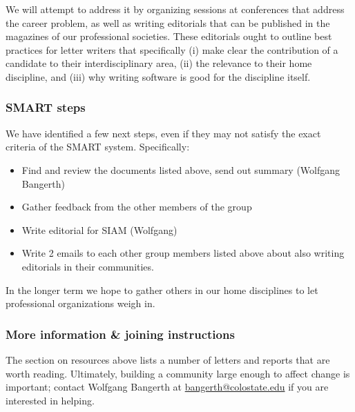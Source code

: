 We will attempt to address it by organizing sessions at conferences
that address the career problem, as well as writing editorials that
can be published in the magazines of our professional societies. These
editorials ought to outline best practices for letter writers that
specifically (i) make clear the contribution of a candidate to their
interdisciplinary area, (ii) the relevance to their home discipline, and
(iii) why writing software is good for the discipline itself.


\subsubsection{SMART steps}

We have identified a few next steps, even if they may not satisfy the
exact criteria of the SMART system. Specifically:
\begin{itemize}
  \item Find and review the documents listed above, send out summary
    (Wolfgang Bangerth)
  \item Gather feedback from the other members of the group
  \item Write editorial for SIAM (Wolfgang)
  \item Write 2 emails to each other group members listed above about
    also writing editorials in their communities.
\end{itemize}
In the longer term we hope to gather others in our home disciplines to
let professional organizations weigh in.


\subsubsection{More information \& joining instructions}

The section on resources above lists a number of letters and reports
that are worth reading. Ultimately, building a community large enough
to affect change is important; contact Wolfgang Bangerth at
\url{bangerth@colostate.edu} if you are interested in helping.
